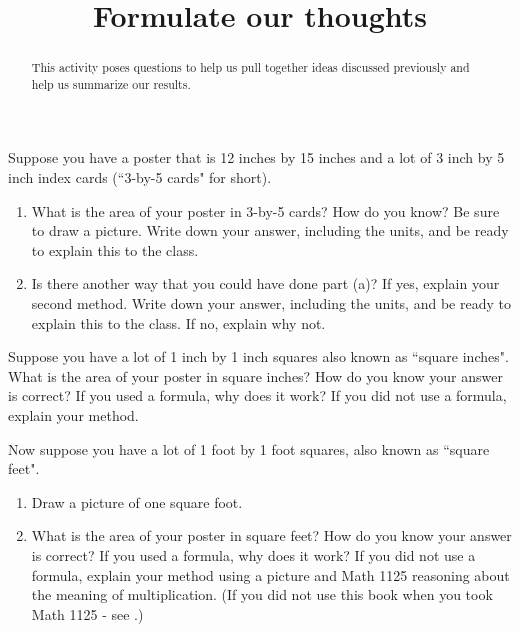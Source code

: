 \documentclass[nooutcomes,handout,noauthor]{ximera}
\title{Formulate our thoughts}
\begin{document}
\begin{abstract}
This activity poses questions to help us pull together ideas discussed previously and help us summarize our results.
\end{abstract}
\maketitle




\begin{problem}
Suppose you have a poster that is 12 inches by 15 inches and a lot of 3 inch by 5 inch index cards (``3-by-5 cards" for short).
\begin{enumerate}
    \item What is the area of your poster in 3-by-5 cards? How do you know?  Be sure to draw a picture.  Write down your answer, including the units, and be ready to explain this to the class.  

    \item Is there another way that you could have done part (a)? If yes, explain your second method. Write down your answer, including the units, and be ready to explain this to the class. If no, explain why not.
\end{enumerate}

\end{problem}


\begin{problem} 
Suppose you have a lot of 1 inch by 1 inch squares also known as ``square inches". What is the area of your poster in square inches? How do you know your answer is correct?  If you used a formula, why does it work?  If you did not use a formula, explain your method.

\end{problem}



\begin{problem}
Now suppose you have a lot of 1 foot by 1 foot squares, also known as ``square feet". 

 \begin{enumerate}
\item Draw a picture of one square foot.
\vskip 1in
\item What is the area of your poster in square feet? How do you know your answer is correct?  If you used a formula, why does it work?  If you did not use a formula, explain your method using a picture and Math 1125 reasoning about the meaning of multiplication. (If you did not use this book when you took Math 1125 - see .)
\end{enumerate}

\end{problem}
\end{document}
